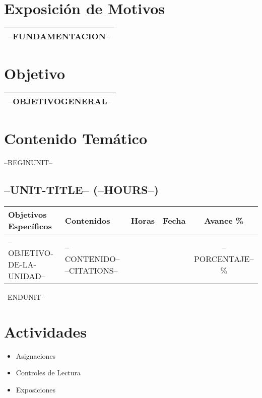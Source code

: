 \documentclass[a4paper]{article}
\begin{document}
\bigskip

\section{Exposición de Motivos}
\begin{tabularx}{\textwidth}{|X|}\hline
--FUNDAMENTACION--
\\ \hline
\end{tabularx}

\section{Objetivo}
\begin{tabularx}{\textwidth}{|X|} \hline
--OBJETIVOGENERAL-- 
\\ \hline
\end{tabularx}

\section{Contenido Temático}
--BEGINUNIT--
\subsection{--UNIT-TITLE-- (--HOURS--)}
\begin{tabularx}{\textwidth}{|X|X|c|c|c|}
\hline
\textbf{Objetivos Específicos} &   \textbf{Contenidos} & \textbf{Horas} & \textbf{Fecha} & \textbf{Avance \%}  \\ \hline
--OBJETIVO-DE-LA-UNIDAD--      & 
--CONTENIDO--
--CITATIONS-- &
&
&
--PORCENTAJE--\%
\\
\hline
\end{tabularx}

--ENDUNIT--


\section{Actividades}
\begin{itemize}
\item Asignaciones
\item Controles de Lectura
\item Exposiciones
\end{itemize} 
\end{document}
